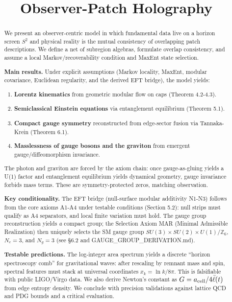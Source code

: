 \documentclass[11pt,a4paper]{article}
\title{Observer-Patch Holography}
\date{}
\theoremstyle{remark}
\providecommand{\tightlist}{%
  \setlength{\itemsep}{0pt}\setlength{\parskip}{0pt}}
\begin{document}
\maketitle

\begin{abstract}
We present an observer-centric model in which fundamental data live on a
horizon screen \(S^2\) and physical reality is the mutual consistency of
overlapping patch descriptions. We define a net of subregion algebras,
formulate overlap consistency, and assume a local Markov/recoverability
condition and MaxEnt state selection.

\textbf{Main results.} Under explicit assumptions (Markov locality, MaxEnt, modular
covariance, Euclidean regularity, and the derived EFT bridge), the model yields:

\begin{enumerate}
\def\labelenumi{\arabic{enumi}.}
\tightlist
\item
  \textbf{Lorentz kinematics} from geometric modular flow on caps (Theorem 4.2-4.3).
\item
  \textbf{Semiclassical Einstein equations} via entanglement equilibrium (Theorem 5.1).
\item
  \textbf{Compact gauge symmetry} reconstructed from edge-sector fusion via
  Tannaka-Krein (Theorem 6.1).
\item
  \textbf{Masslessness of gauge bosons and the graviton} from emergent
  gauge/diffeomorphism invariance.
\end{enumerate}

The photon and graviton are forced by the axiom chain: once gauge-as-gluing
yields a U(1) factor and entanglement equilibrium yields dynamical geometry,
gauge invariance forbids mass terms. These are symmetry-protected zeros,
matching observation.

\textbf{Key conditionality.} The EFT bridge (null-surface modular additivity N1-N3)
follows from the core axioms A1-A4 under testable conditions (Section
5.2): null strips must qualify as A4 separators, and local finite variation
must hold. The gauge group reconstruction yields \emph{a} compact group; the
Selection Axiom MAR (Minimal Admissible Realization) then uniquely selects
the SM gauge group \(SU(3) \times SU(2) \times U(1)/\mathbb{Z}_6\), \(N_c = 3\),
and \(N_g = 3\) (see §6.2 and GAUGE\_GROUP\_DERIVATION.md).

\textbf{Testable predictions.} The log-integer area spectrum yields a discrete
``horizon spectroscopy comb'' for gravitational waves: after rescaling by
remnant mass and spin, spectral features must stack at universal coordinates
\(x_k = \ln k / 8\pi\). This is falsifiable with public LIGO/Virgo data. We
also derive Newton's constant as \(G = a_{\rm cell}/4\bar{\ell}(t)\) from edge
entropy density. We conclude with precision
validations against lattice QCD and PDG bounds and a critical evaluation.


\end{abstract}
\end{document}

